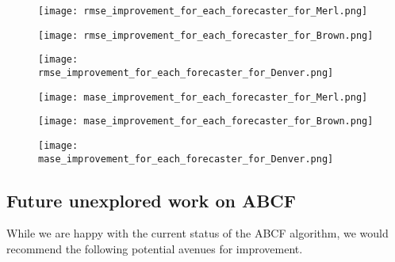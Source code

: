   
\begin{figure}[!h]
	\begin{center}
		\texttt{[image: rmse\_improvement\_for\_each\_forecaster\_for\_Merl.png]}
	\end{center}
	\caption{}
	\label{fig:rmse_improve_merl}
\end{figure}

\begin{figure}[!h]
	\begin{center}
		\texttt{[image: rmse\_improvement\_for\_each\_forecaster\_for\_Brown.png]}
	\end{center}
	\caption{}
	\label{fig:rmse_improve_brown}
\end{figure}

\begin{figure}[!h]
	\begin{center}
		\texttt{[image: rmse\_improvement\_for\_each\_forecaster\_for\_Denver.png]}
	\end{center}
	\caption{}
	\label{fig:rmse_improve_denver}
\end{figure}

\begin{figure}[!h]
	\begin{center}
		\texttt{[image: mase\_improvement\_for\_each\_forecaster\_for\_Merl.png]}
	\end{center}
	\caption{}
	\label{fig:mase_improve_merl}
\end{figure}

\begin{figure}[!h]
	\begin{center}
		\texttt{[image: mase\_improvement\_for\_each\_forecaster\_for\_Brown.png]}
	\end{center}
	\caption{}
	\label{fig:mase_improve_brown}
\end{figure}

\begin{figure}[!h]
	\begin{center}
		\texttt{[image: mase\_improvement\_for\_each\_forecaster\_for\_Denver.png]}
	\end{center}
	\caption{}
	\label{fig:mase_improve_denver}
\end{figure}

\newpage


\subsection{Future unexplored work on ABCF}
While we are happy with the current status of the ABCF algorithm, we would recommend the following potential avenues for improvement.

